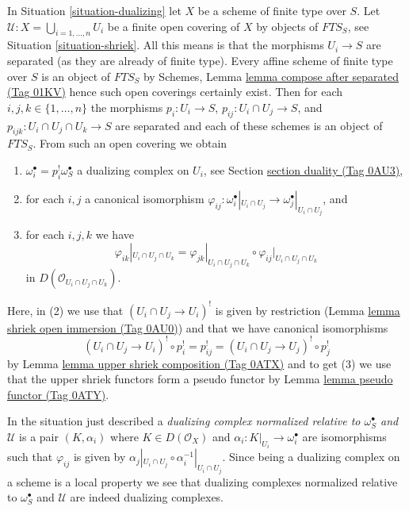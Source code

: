 \documentclass{amsart}
\theoremstyle{plain}
\theoremstyle{definition}
\theoremstyle{remark}
\numberwithin{equation}{subsection}
\begin{document}
\noindent
In Situation \ref{situation-dualizing} let $X$ be a scheme of finite type
over $S$. Let $\mathcal{U} : X = \bigcup_{i = 1, \ldots, n} U_i$
be a finite open covering of $X$ by objects of $\textit{FTS}_S$, see
Situation \ref{situation-shriek}. All this means is that the morphisms
$U_i \to S$ are separated (as they are already of finite type).
Every affine scheme of finite type over $S$ is an object of $\textit{FTS}_S$
by Schemes, Lemma \href{https://stacks.math.columbia.edu/tag/01KV}{lemma compose after separated (Tag 01KV)}
hence such open coverings certainly exist.
Then for each $i, j, k \in \{1, \ldots, n\}$
the morphisms $p_i : U_i \to S$, $p_{ij} : U_i \cap U_j \to S$,
and $p_{ijk} : U_i \cap U_j \cap U_k \to S$ are separated and
each of these schemes is an object of $\textit{FTS}_S$.
From such an open covering we obtain
\begin{enumerate}
\item $\omega_i^\bullet = p_i^!\omega_S^\bullet$
a dualizing complex on $U_i$, see Section \href{https://stacks.math.columbia.edu/tag/0AU3}{section duality (Tag 0AU3)},
\item for each $i, j$ a canonical isomorphism
$\varphi_{ij} :
\omega_i^\bullet|_{U_i \cap U_j} \to \omega_j^\bullet|_{U_i \cap U_j}$, and
\item
\label{item-cocycle-glueing}
for each $i, j, k$ we have
$$
\varphi_{ik}|_{U_i \cap U_j \cap U_k} =
\varphi_{jk}|_{U_i \cap U_j \cap U_k} \circ
\varphi_{ij}|_{U_i \cap U_j \cap U_k}
$$
in $D(\mathcal{O}_{U_i \cap U_j \cap U_k})$.
\end{enumerate}
Here, in (2) we use that $(U_i \cap U_j \to U_i)^!$
is given by restriction (Lemma \href{https://stacks.math.columbia.edu/tag/0AU0}{lemma shriek open immersion (Tag 0AU0)})
and that we have canonical isomorphisms
$$
(U_i \cap U_j \to U_i)^! \circ p_i^! = p_{ij}^! =
(U_i \cap U_j \to U_j)^! \circ p_j^!
$$
by Lemma \href{https://stacks.math.columbia.edu/tag/0ATX}{lemma upper shriek composition (Tag 0ATX)} and to get (3) we use
that the upper shriek functors form a pseudo functor by
Lemma \href{https://stacks.math.columbia.edu/tag/0ATY}{lemma pseudo functor (Tag 0ATY)}.

\medskip\noindent
In the situation just described a
{\it dualizing complex normalized relative to $\omega_S^\bullet$
and $\mathcal{U}$} is a pair $(K, \alpha_i)$ where $K \in D(\mathcal{O}_X)$
and $\alpha_i : K|_{U_i} \to \omega_i^\bullet$ are isomorphisms
such that $\varphi_{ij}$ is given by
$\alpha_j|_{U_i \cap U_j} \circ \alpha_i^{-1}|_{U_i \cap U_j}$.
Since being a dualizing complex on a scheme is a local property
we see that dualizing complexes normalized relative to $\omega_S^\bullet$
and $\mathcal{U}$ are indeed dualizing complexes.
\end{document}
